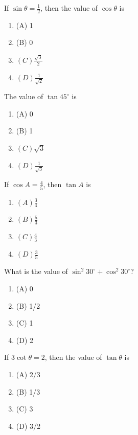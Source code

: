 \documentclass[12pt,a4paper]{exam}
\begin{document}
\begin{questions}
\question[1] If $\sin \theta = \frac{1}{2}$, then the value of $\cos \theta$ is
\begin{enumerate}[label=(\Alph*)]
  \item (A) 1
  \item (B) 0
  \item $(C) \frac{\sqrt{3}}{2}$
  \item $(D) \frac{1}{\sqrt{2}}$
\end{enumerate}
\vspace{0.15cm}

\question[1] The value of $\tan 45^\circ$ is
\begin{enumerate}[label=(\Alph*)]
  \item (A) 0
  \item (B) 1
  \item $(C) \sqrt{3}$
  \item $(D) \frac{1}{\sqrt{3}}$
\end{enumerate}
\vspace{0.15cm}

\question[1] If $\cos A = \frac{4}{5}$, then $\tan A$ is
\begin{enumerate}[label=(\Alph*)]
  \item $(A) \frac{3}{4}$
  \item $(B) \frac{5}{3}$
  \item $(C) \frac{4}{3}$
  \item $(D) \frac{3}{5}$
\end{enumerate}
\vspace{0.15cm}

\question[1] What is the value of $\sin^2 30^\circ + \cos^2 30^\circ$?
\begin{enumerate}[label=(\Alph*)]
  \item (A) 0
  \item (B) 1/2
  \item (C) 1
  \item (D) 2
\end{enumerate}
\vspace{0.15cm}

\question[1] If $3 \cot \theta = 2$, then the value of $\tan \theta$ is
\begin{enumerate}[label=(\Alph*)]
  \item (A) 2/3
  \item (B) 1/3
  \item (C) 3
  \item (D) 3/2
\end{enumerate}
\vspace{0.15cm}


\end{questions}
\end{document}
